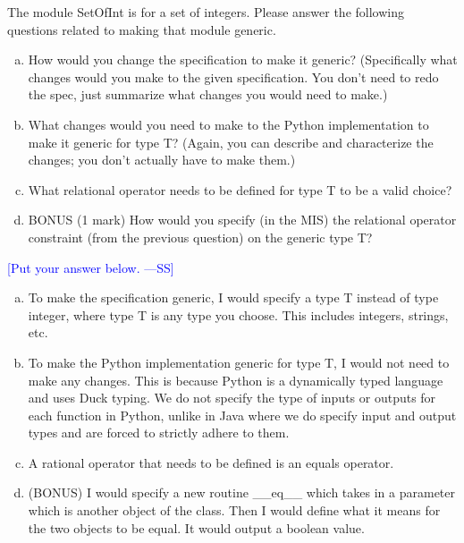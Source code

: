 \documentclass[12pt,fleqn]{examtst}
\newcommand{\authornote}[3]{\textcolor{#1}{[#3 ---#2]}}
\newcommand{\authornote}[3]{}
\newcommand{\wss}[1]{\authornote{blue}{SS}{#1}}
\begin{document}
\noindent
\begin{minipage}{\textwidth}

The module SetOfInt is for a set of integers.  Please answer the following
questions related to making that module generic. 
\begin{enumerate}[a.]
\item How would you change the specification to make it generic?  (Specifically
  what changes would you make to the given specification.  You don't need to
  redo the spec, just summarize what changes you would need to make.)
\item What changes would you need to make to the Python
implementation to make it generic for type T?  (Again, you can describe and
characterize the changes; you don't actually have to make them.)
\item What relational operator needs to be defined for type T to be a valid
  choice?
\item BONUS (1 mark) How would you specify (in the MIS) the relational operator
  constraint (from the previous question) on the generic type T?
\end{enumerate}

\wss{Put your answer below.}

\begin{enumerate}[a.]
\item To make the specification generic, I would specify a type T instead of type integer, where type T is any type you choose. This includes integers, strings, etc. 
\item To make the Python implementation generic for type T, I would not need to make any changes. This is because Python is a dynamically typed language and uses Duck typing. We do not specify the type of inputs or outputs for each function in Python, unlike in Java where we do specify input and output types and are forced to strictly adhere to them.
\item A rational operator that needs to be defined is an equals operator.
\item (BONUS) I would specify a new routine \_\_eq\_\_ which takes in a parameter which is another object of the class. Then I would define what it means for the two objects to be equal. It would output a boolean value.
\end{enumerate}

\end{minipage}
\end{document}
